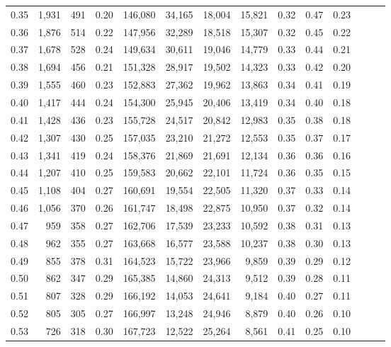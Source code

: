 \begin{tabular}{rrrrrrrrrrrrrr}
0.35 &  1,931 &  491 &  0.20 &  146,080 &   34,165 &  18,004 &  15,821 &  0.32 &  0.47 &      0.23 \\
0.36 &  1,876 &  514 &  0.22 &  147,956 &   32,289 &  18,518 &  15,307 &  0.32 &  0.45 &      0.22 \\
0.37 &  1,678 &  528 &  0.24 &  149,634 &   30,611 &  19,046 &  14,779 &  0.33 &  0.44 &      0.21 \\
0.38 &  1,694 &  456 &  0.21 &  151,328 &   28,917 &  19,502 &  14,323 &  0.33 &  0.42 &      0.20 \\
0.39 &  1,555 &  460 &  0.23 &  152,883 &   27,362 &  19,962 &  13,863 &  0.34 &  0.41 &      0.19 \\
0.40 &  1,417 &  444 &  0.24 &  154,300 &   25,945 &  20,406 &  13,419 &  0.34 &  0.40 &      0.18 \\
0.41 &  1,428 &  436 &  0.23 &  155,728 &   24,517 &  20,842 &  12,983 &  0.35 &  0.38 &      0.18 \\
0.42 &  1,307 &  430 &  0.25 &  157,035 &   23,210 &  21,272 &  12,553 &  0.35 &  0.37 &      0.17 \\
0.43 &  1,341 &  419 &  0.24 &  158,376 &   21,869 &  21,691 &  12,134 &  0.36 &  0.36 &      0.16 \\
0.44 &  1,207 &  410 &  0.25 &  159,583 &   20,662 &  22,101 &  11,724 &  0.36 &  0.35 &      0.15 \\
0.45 &  1,108 &  404 &  0.27 &  160,691 &   19,554 &  22,505 &  11,320 &  0.37 &  0.33 &      0.14 \\
0.46 &  1,056 &  370 &  0.26 &  161,747 &   18,498 &  22,875 &  10,950 &  0.37 &  0.32 &      0.14 \\
0.47 &    959 &  358 &  0.27 &  162,706 &   17,539 &  23,233 &  10,592 &  0.38 &  0.31 &      0.13 \\
0.48 &    962 &  355 &  0.27 &  163,668 &   16,577 &  23,588 &  10,237 &  0.38 &  0.30 &      0.13 \\
0.49 &    855 &  378 &  0.31 &  164,523 &   15,722 &  23,966 &   9,859 &  0.39 &  0.29 &      0.12 \\
0.50 &    862 &  347 &  0.29 &  165,385 &   14,860 &  24,313 &   9,512 &  0.39 &  0.28 &      0.11 \\
0.51 &    807 &  328 &  0.29 &  166,192 &   14,053 &  24,641 &   9,184 &  0.40 &  0.27 &      0.11 \\
0.52 &    805 &  305 &  0.27 &  166,997 &   13,248 &  24,946 &   8,879 &  0.40 &  0.26 &      0.10 \\
0.53 &    726 &  318 &  0.30 &  167,723 &   12,522 &  25,264 &   8,561 &  0.41 &  0.25 &      0.10 \\

\end{tabular}
